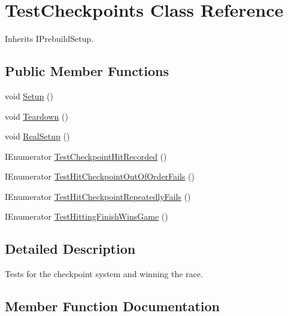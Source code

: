 \hypertarget{class_test_checkpoints}{}\section{Test\+Checkpoints Class Reference}
\label{class_test_checkpoints}


Inherits I\+Prebuild\+Setup.

\subsection*{Public Member Functions}
\begin{DoxyCompactItemize}
\item 
void \hyperlink{class_test_checkpoints_a0289aed3d7797a957e8d2b1d076e4747}{Setup} ()
\item 
void \hyperlink{class_test_checkpoints_a951c529270c526ccbcb75e0dd66f3625}{Teardown} ()
\item 
void \hyperlink{class_test_checkpoints_aea5f3ddc6b621a5e24d767a457e1bf29}{Real\+Setup} ()
\item 
I\+Enumerator \hyperlink{class_test_checkpoints_ab5b10117fcbbd425531ee9dc7bc37bfd}{Test\+Checkpoint\+Hit\+Recorded} ()
\item 
I\+Enumerator \hyperlink{class_test_checkpoints_aae8a7ff45f25ef40dc7fb7634f9cb8b7}{Test\+Hit\+Checkpoint\+Out\+Of\+Order\+Fails} ()
\item 
I\+Enumerator \hyperlink{class_test_checkpoints_a63efe64ce70c26ce129a9314bd005a88}{Test\+Hit\+Checkpoint\+Repeatedly\+Fails} ()
\item 
I\+Enumerator \hyperlink{class_test_checkpoints_a96497243b0586c2eb5a98cc359079a29}{Test\+Hitting\+Finish\+Wins\+Game} ()
\end{DoxyCompactItemize}


\subsection{Detailed Description}
Tests for the checkpoint system and winning the race. 



\subsection{Member Function Documentation}
\mbox{\label{class_test_checkpoints_aea5f3ddc6b621a5e24d767a457e1bf29}} 
